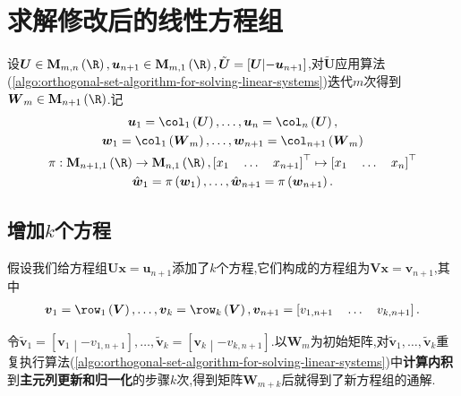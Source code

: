 \section{求解修改后的线性方程组}

设$\boldsymbol{U}\in\mathbf{M}_{m,n}\left(\R\right),\boldsymbol{u}_{n+1}\in\mathbf{M}_{m,1}\left(\R\right),\tilde{\boldsymbol{U}}=\left[\boldsymbol{U}\middle|-\boldsymbol{u}_{n+1}\right]$,对$\tilde{\boldsymbol{U}}$应用算法(\ref{algo:orthogonal-set-algorithm-for-solving-linear-systems})迭代$m$次得到$\boldsymbol{W}_{m}\in\mathbf{M}_{n+1}\left(\R\right)$.记
\begin{gather*}
	\boldsymbol{u}_{1}=\col_{1}\left(\boldsymbol{U}\right),\ldots,\boldsymbol{u}_{n}=\col_{n}\left(\boldsymbol{U}\right),\\
	\boldsymbol{w}_{1}=\col_{1}\left(\boldsymbol{W}_{m}\right),\ldots,\boldsymbol{w}_{n+1}=\col_{n+1}\left(\boldsymbol{W}_{m}\right)\\
	\pi:\mathbf{M}_{n+1,1}\left(\R\right)\to\mathbf{M}_{n,1}\left(\R\right),\left[x_{1}\quad\ldots\quad x_{n+1}\right]^{\top}\mapsto\left[x_{1}\quad\ldots\quad x_{n}\right]^{\top}\\
	\hat{\boldsymbol{w}}_{1}=\pi\left(\boldsymbol{w}_{1}\right),\ldots,\hat{\boldsymbol{w}}_{n+1}=\pi\left(\boldsymbol{w}_{n+1}\right).
\end{gather*}

\subsection*{增加$k$个方程}

假设我们给方程组$\boldsymbol{U}\boldsymbol{x}=\boldsymbol{u}_{n+1}$添加了$k$个方程,它们构成的方程组为$\boldsymbol{V}\boldsymbol{x}=\boldsymbol{v}_{n+1}$,其中
\begin{align*}
	\boldsymbol{v}_{1}=\row_{1}\left(\boldsymbol{V}\right),\ldots,\boldsymbol{v}_{k}=\row_{k}\left(\boldsymbol{V}\right),\boldsymbol{v}_{n+1}=\left[v_{1,n+1}\quad\ldots\quad v_{k,n+1}\right].
\end{align*}

令$\tilde{\boldsymbol{v}}_{1}=\left[\boldsymbol{v}_{1}\middle|-v_{1,n+1}\right],\ldots,\tilde{\boldsymbol{v}}_{k}=\left[\boldsymbol{v}_{k}\middle|-v_{k,n+1}\right]$.以$\boldsymbol{W}_{m}$为初始矩阵,对$\tilde{\boldsymbol{v}}_{1},\ldots,\tilde{\boldsymbol{v}}_{k}$重复执行算法(\ref{algo:orthogonal-set-algorithm-for-solving-linear-systems})中\textbf{计算内积}到\textbf{主元列更新和归一化}的步骤$k$次,得到矩阵$\boldsymbol{W}_{m+k}$后就得到了新方程组的通解.

